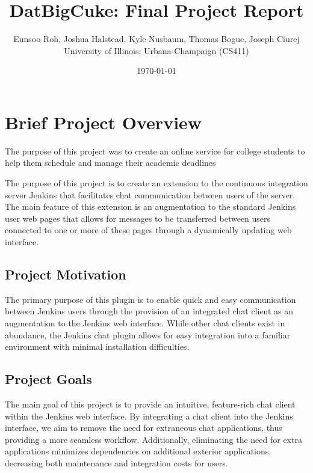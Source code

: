 \documentclass{article}
\begin{document}
	\title{DatBigCuke: Final Project Report}
	\author{Eunsoo Roh, Joshua Halstead, Kyle Nusbaum, Thomas Bogue, Joseph Ciurej \\
		University of Illinois: Urbana-Champaign (CS411)}
	\date{\today}
	\maketitle

	\tableofcontents
	\clearpage

	\section[Project Overview]{Brief Project Overview}
	The purpose of this project was to create an online service for college
	students to help them schedule and manage their academic deadlines

	The purpose of this project is to create an extension to the continuous 
	integration server Jenkins that facilitates chat communication between
	users of the server.  The main feature of this extension is an augmentation
	to the standard Jenkins user web pages that allows for messages to be 
	transferred between users connected to one or more of these pages through
	a dynamically updating web interface.

		\subsection[Motiviation]{Project Motivation}
		The primary purpose of this plugin is to enable quick and easy 
		communication between Jenkins users through the provision of an 
		integrated chat client as an augmentation to the Jenkins web interface.
		While other chat clients exist in abundance, the Jenkins chat plugin
		allows for easy integration into a familiar environment with minimal
		installation difficulties.

		\subsection[Goals]{Project Goals}
		The main goal of this project is to provide an intuitive, feature-rich
		chat client within the Jenkins web interface.  By integrating a chat client
		into the Jenkins interface, we aim to remove the need for extraneous chat 
		applications, thus providing a more seamless workflow.  Additionally,
		eliminating the need for extra applications minimizes dependencies on
		additional exterior applications, decreasing both maintenance and
		integration costs for users.
\end{document}
